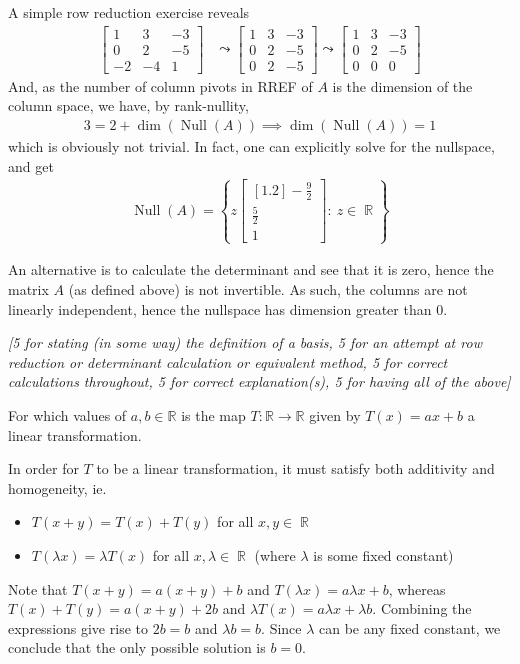 \documentclass[answers,11pt]{exam}
\theoremstyle{definition}
\DeclareMathOperator{\R}{\mathbb{R}}
\DeclareMathOperator{\1}{\mathbbm{1}}
\DeclareMathOperator{\nul}{Null}
\newcommand{\condset}[4]{\left\{ #1  : \: #2 #3 #4 \right\}}
\begin{document}
\begin{questions}
\begin{solution}
	A simple row reduction exercise reveals
	\begin{align*}
	\begin{bmatrix}
	1& 3 & -3\\
	0& 2 & -5 \\
	-2 & -4 &1
	\end{bmatrix} & \leadsto \begin{bmatrix}
	1& 3 & -3\\
	0& 2 & -5 \\
	0 & 2 & -5
	\end{bmatrix} \leadsto \begin{bmatrix}
	1& 3 & -3\\
	0& 2 & -5 \\
	0 & 0 & 0
	\end{bmatrix}
	\end{align*}
	And, as the number of column pivots in RREF of $A$ is the dimension of the column space, we have, by rank-nullity,
	\begin{align*}
	3 = 2 + \dim (\nul(A)) \implies \dim(\nul(A)) = 1
	\end{align*}
	which is obviously not trivial. In fact, one can explicitly solve for the nullspace, and get
	\begin{align*}
	\nul(A) = \condset{z \begin{bmatrix}[1.2]
		-\frac{9}{2} \\ \frac{5}{2} \\ 1
		\end{bmatrix}}{z}{\in}{\R}
	\end{align*}
	
	An alternative is to calculate the determinant and see that it is zero, hence the matrix $A$ (as defined above) is not invertible. As such, the columns are not linearly independent, hence the nullspace has dimension greater than 0.
	
	\textit{[5 for stating (in some way) the definition of a basis, 5 for an attempt at row reduction or determinant calculation or equivalent method, 5 for correct calculations throughout, 5 for correct explanation(s), 5 for having all of the above]}
\end{solution}


\question[25] For which values of $a,b\in \mathbb{R}$ is the map $T:\mathbb{R}\to \mathbb{R}$ given by $T(x)=ax+b$ a linear transformation.

\begin{solution}
	In order for $T$ to be a linear transformation, it must satisfy both additivity and homogeneity, ie.
	\begin{itemize}
		\item $T(x+y) = T(x) + T(y)$ for all $x,y \in \R$
		\item $T(\lambda x) = \lambda T(x)$ for all $x, \lambda \in \R$ (where $\lambda$ is some fixed constant)
	\end{itemize}
	Note that $T(x+y) = a(x+y)+b$ and $T(\lambda x) = a\lambda x + b$, whereas $T(x)+T(y) = a(x+y) +2b$ and $\lambda T(x) = a \lambda x + \lambda b$. Combining the expressions give rise to $2b = b$ and $\lambda b = b$. Since $\lambda $ can be any fixed constant, we conclude that the only possible solution is $b = 0$.
	

\end{solution}
\end{questions}
\end{document}
